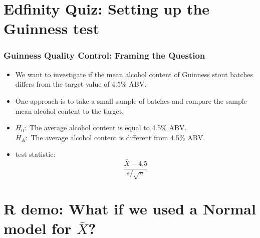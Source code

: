 \documentclass[slidestop,compress,mathserif]{beamer}
\newcommand{\soln}[1]{\textit{#1}}
\begin{document}
\section{Edfinity Quiz: Setting up the Guinness test}


\begin{frame}
\frametitle{Guinness Quality Control: Framing the Question}

\begin{itemize}
\item We want to investigate if the mean alcohol content of Guinness stout batches differs from the target value of 4.5\% ABV.
\pause
\item One approach is to take a small sample of batches and compare the sample mean alcohol content to the target.
\pause
\item $H_0:$ The average alcohol content is equal to 4.5\% ABV. \\
$H_A:$ The average alcohol content is different from 4.5\% ABV.
\pause
\item test statistic: \[ \frac{\bar{X} - 4.5}{s / \sqrt{n}} \]
\end{itemize}




\end{frame}

\section{R demo: What if we used a Normal model for \texorpdfstring{$\bar{X}$}{X-bar}?}
\end{document}
